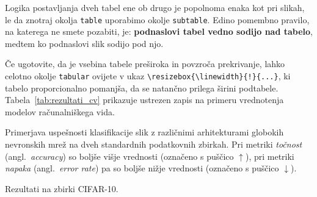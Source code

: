 \documentclass[a4paper,12pt,openright]{book}
\begin{document}
Logika postavljanja dveh tabel ene ob drugo je popolnoma enaka kot pri slikah, le da znotraj okolja \texttt{table} uporabimo okolje \texttt{subtable}. Edino pomembno pravilo, na katerega ne smete pozabiti, je: \textbf{podnaslovi tabel vedno sodijo nad tabelo}, medtem ko podnaslovi slik sodijo pod njo. 

Če ugotovite, da je vsebina tabele preširoka in povzroča prekrivanje, lahko celotno okolje \texttt{tabular} ovijete v ukaz \texttt{\textbackslash resizebox\{\textbackslash linewidth\}\{!\}\{...\}}, ki tabelo proporcionalno pomanjša, da se natančno prilega širini podtabele. Tabela~\ref{tab:rezultati_cv} prikazuje ustrezen zapis na primeru vrednotenja modelov računalniškega vida.

\begin{table}[htbp]
    \centering
    \caption{Primerjava uspešnosti klasifikacije slik z različnimi arhitekturami globokih nevronskih mrež na dveh standardnih podatkovnih zbirkah. Pri metriki \textit{točnost} (angl.\ \textit{accuracy}) so boljše višje vrednosti (označeno s puščico $\uparrow$), pri metriki \textit{napaka} (angl.\ \textit{error rate}) pa so boljše nižje vrednosti (označeno s puščico $\downarrow$).}
    \label{tab:rezultati_cv}
    \begin{subtable}[b]{0.48\textwidth}
        \centering
        \caption{Rezultati na zbirki CIFAR-10.}
        \label{tab:cifar10}
    \end{subtable}
    \hfill
    \begin{subtable}[b]{0.48\textwidth}
        \centering
        \caption{Rezultati na zbirki ImageNet.}
        \label{tab:imagenet}
    \end{subtable}

\end{table}
\end{document}
